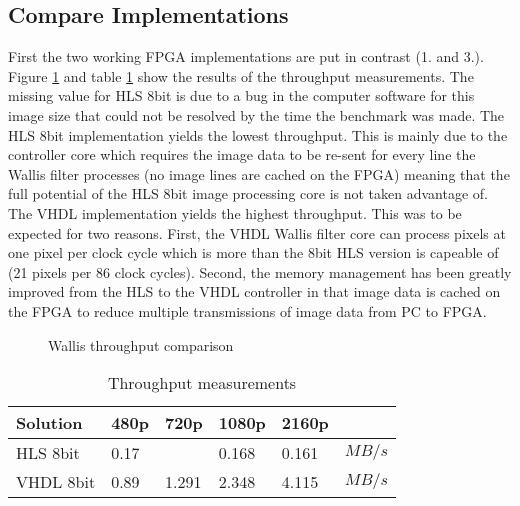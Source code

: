 \subsection{Compare Implementations}
First the two working FPGA implementations are put in contrast (1. and 3.).
Figure \ref{fig:benchmarkcompare} and table \ref{tab:throughputmeasuremetns}
show the results of the throughput measurements. The missing value for HLS 8bit
is due to a bug in the computer software for this image size that could not be
resolved by the time the benchmark was made. The HLS 8bit implementation yields
the lowest throughput. This is mainly due to the controller core which requires
the image data to be re-sent for every line the Wallis filter processes 
(no
image lines are cached on the FPGA) meaning
that the full potential of the HLS 8bit image processing core is not taken
advantage of. The VHDL implementation yields the
highest
throughput. This was to be expected for two
reasons. First, the VHDL Wallis filter core can process pixels at one pixel per
clock cycle which is more than the 8bit HLS version is capeable of (21 pixels
per 86 clock cycles).
Second, the memory management has been greatly improved from the HLS to the VHDL
controller in that image data is cached on the FPGA to reduce multiple
transmissions of image data from PC to FPGA. 

\begin{figure}[tb!]
    \centering
    \begin{adjustbox}{max width=\linewidth}
        
    \end{adjustbox}
    \caption{Wallis throughput comparison}
    \label{fig:benchmarkcompare}
\end{figure}

\begin{table}[tb!]
    \centering
    \begin{tabular}{l l l l l l}
        \toprule
        Solution & 480p & 720p & 1080p & 2160p & \\
        \midrule
        HLS 8bit   & 0.17  &       & 0.168 & 0.161 & $MB/s$ \\
        VHDL 8bit      & 0.89  & 1.291 & 2.348 & 4.115 & $MB/s$\\
        \bottomrule
    \end{tabular}
    \caption{Throughput measurements}
    \label{tab:throughputmeasuremetns}
\end{table}

